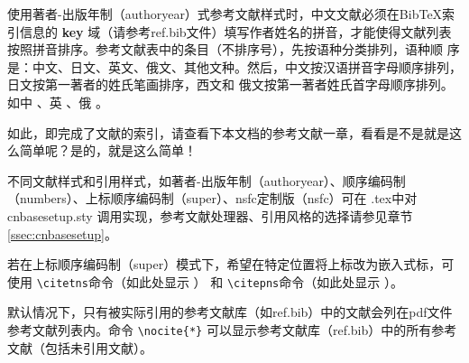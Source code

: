 使用著者-出版年制（authoryear）式参考文献样式时，中文文献必须在BibTeX索引信息的 \textbf{key} 域（请参考ref.bib文件）填写作者姓名的拼音，才能使得文献列表按照拼音排序。参考文献表中的条目（不排序号），先按语种分类排列，语种顺 序是：中文、日文、英文、俄文、其他文种。然后，中文按汉语拼音字母顺序排列，日文按第一著者的姓氏笔画排序，西文和 俄文按第一著者姓氏首字母顺序排列。如中 \citep{wei2021_bayesian,matThm_zhang2013}、英 \citep{AMARI1993185,mirza2018human}、俄 \citep{Dubrovin1906}。

如此，即完成了文献的索引，请查看下本文档的参考文献一章，看看是不是就是这么简单呢？是的，就是这么简单！

不同文献样式和引用样式，如著者-出版年制（authoryear）、顺序编码制（numbers）、上标顺序编码制（super）、nsfc定制版（nsfc）可在 \projectname.tex中对 cnbasesetup.sty 调用实现，参考文献处理器、引用风格的选择请参见章节\ref{ssec:cnbasesetup}。

若在上标顺序编码制（super）模式下，希望在特定位置将上标改为嵌入式标，可使用 \verb|\citetns|命令（如此处显示 ） 和 \verb|\citepns|命令（如此处显示 ）。



默认情况下，只有被实际引用的参考文献库（如ref.bib）中的文献会列在pdf文件参考文献列表内。命令 \verb|\nocite{*}| 可以显示参考文献库（ref.bib）中的所有参考文献（包括未引用文献）。